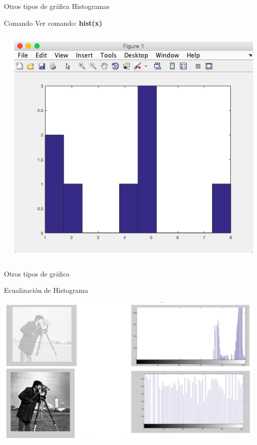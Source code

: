\documentclass{bredelebeamer}
\begin{document}
\begin{frame}{Otros tipos de gráfica}
Histogramas
\begin{exampleblock}{Comando}
Ver comando: \textbf{hist(x)}
\end{exampleblock}
\begin{columns}
\begin{column}{0.5\textwidth}

\end{column}
\begin{column}{0.5\textwidth}
\begin{center}
\includegraphics[scale=0.2]{images/pantalla26.png}
\end{center}
\end{column}
\end{columns}
\end{frame}



\begin{frame}{Otros tipos de gráfica}
\begin{center}
Ecualización de Histograma
\end{center}
\begin{center}
\includegraphics[scale=0.5]{images/img40.png}
\end{center}
\end{frame}
\end{document}
